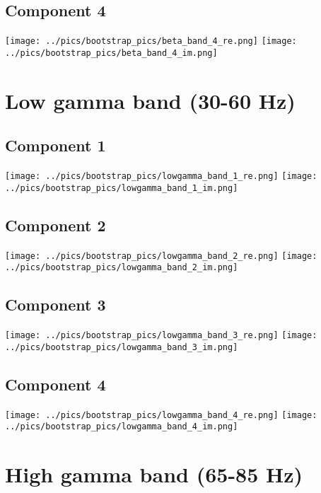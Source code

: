 \documentclass{article}
\begin{document}
\subsection*{Component 4}
\texttt{[image: ../pics/bootstrap\_pics/beta\_band\_4\_re.png]}
\hspace{2cm}
\texttt{[image: ../pics/bootstrap\_pics/beta\_band\_4\_im.png]}

\justify
\section{Low gamma band (30-60 Hz)}
\centering
\subsection*{Component 1}
\texttt{[image: ../pics/bootstrap\_pics/lowgamma\_band\_1\_re.png]}
\hspace{2cm}
\texttt{[image: ../pics/bootstrap\_pics/lowgamma\_band\_1\_im.png]}

\subsection*{Component 2}
\texttt{[image: ../pics/bootstrap\_pics/lowgamma\_band\_2\_re.png]}
\hspace{2cm}
\texttt{[image: ../pics/bootstrap\_pics/lowgamma\_band\_2\_im.png]}

\subsection*{Component 3}
\texttt{[image: ../pics/bootstrap\_pics/lowgamma\_band\_3\_re.png]}
\hspace{2cm}
\texttt{[image: ../pics/bootstrap\_pics/lowgamma\_band\_3\_im.png]}

\subsection*{Component 4}
\texttt{[image: ../pics/bootstrap\_pics/lowgamma\_band\_4\_re.png]}
\hspace{2cm}
\texttt{[image: ../pics/bootstrap\_pics/lowgamma\_band\_4\_im.png]}

\justify
\section{High gamma band (65-85 Hz)}
\centering
\end{document}

